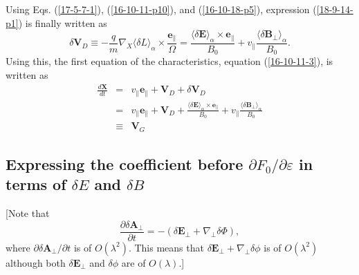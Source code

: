 \documentclass{llncs}
\newcommand{\tmem}[1]{{\em #1\/}}
\begin{document}
Using Eqs. (\ref{17-5-7-1}), (\ref{16-10-11-p10}), and (\ref{16-10-18-p5}),
expression (\ref{18-9-14-p1}) is finally written as
\begin{equation}
  \label{21-8-5-p1} \delta \mathbf{V}_D \equiv - \frac{q}{m} \nabla_X \langle
  \delta L \rangle_{\alpha} \times \frac{\mathbf{e}_{\parallel}}{\Omega} =
  \frac{\langle \delta \mathbf{E} \rangle_{\alpha} \times
  \mathbf{e}_{\parallel}}{B_0} + v_{\parallel} \frac{\langle \delta
  \mathbf{B}_{\perp} \rangle_{\alpha}}{B_0} .
\end{equation}
Using this, the first equation of the characteristics, equation
(\ref{16-10-11-3}), is written as
\begin{eqnarray}
  \frac{d\mathbf{X}}{d t} & = & v_{\parallel} \mathbf{e}_{\parallel}
  +\mathbf{V}_D + \delta \mathbf{V}_D  \label{16-10-11-p20}\\
  & = & v_{\parallel} \mathbf{e}_{\parallel} +\mathbf{V}_D + \frac{\langle
  \delta \mathbf{E} \rangle_{\alpha} \times \mathbf{e}_{\parallel}}{B_0} +
  v_{\parallel} \frac{\langle \delta \mathbf{B}_{\perp} \rangle_{\alpha}}{B_0}
  \nonumber\\
  & \equiv & \mathbf{V}_G 
\end{eqnarray}

\subsection{Expressing {\tmem{}}the coefficient before $\partial F_0 /
\partial \varepsilon$ in terms of $\delta E$ and $\delta B$}

[Note that
\begin{equation}
  \frac{\partial \delta \mathbf{A}_{\perp}}{\partial t} = - (\delta
  \mathbf{E}_{\perp} + \nabla_{\perp} \delta \Phi),
\end{equation}
where $\partial \delta \mathbf{A}_{\perp} / \partial t$ is of $O (\lambda^2)$.
This means that $\delta \mathbf{E}_{\perp} + \nabla_{\perp} \delta \phi$ is of
$O (\lambda^2)$ although both $\delta \mathbf{E}_{\perp}$ and $\delta \phi$
are of $O (\lambda)$.]
\end{document}
